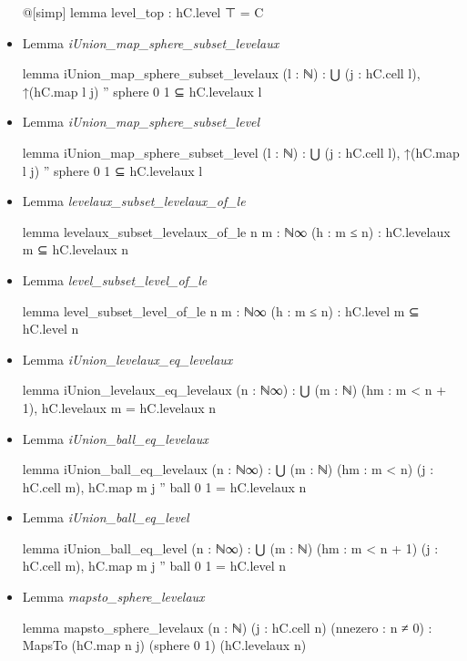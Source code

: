 \documentclass[colorinlistoftodos]{article}
\begin{document}
\begin{itemize}
\begin{leancode}
@[simp] lemma level_top : hC.level ⊤ = C
\end{leancode}
  \item Lemma \emph{iUnion\_map\_sphere\_subset\_levelaux}
\begin{leancode}
lemma iUnion_map_sphere_subset_levelaux (l : ℕ) : 
  ⋃ (j : hC.cell l), ↑(hC.map l j) '' sphere 0 1 ⊆ hC.levelaux l
\end{leancode}
  \item Lemma \emph{iUnion\_map\_sphere\_subset\_level}
\begin{leancode}
lemma iUnion_map_sphere_subset_level (l : ℕ) :
  ⋃ (j : hC.cell l), ↑(hC.map l j) '' sphere 0 1 ⊆ hC.levelaux l
\end{leancode}
  \item Lemma \emph{levelaux\_subset\_levelaux\_of\_le}
\begin{leancode}
lemma levelaux_subset_levelaux_of_le {n m : ℕ∞} (h : m ≤ n) :
  hC.levelaux m ⊆ hC.levelaux n
\end{leancode}
  \item Lemma \emph{level\_subset\_level\_of\_le}
\begin{leancode}
lemma level_subset_level_of_le {n m : ℕ∞} (h : m ≤ n) : hC.level m ⊆ hC.level n
\end{leancode}
  \item Lemma \emph{iUnion\_levelaux\_eq\_levelaux}
\begin{leancode}
lemma iUnion_levelaux_eq_levelaux (n : ℕ∞) : 
  ⋃ (m : ℕ) (hm : m < n + 1), hC.levelaux m = hC.levelaux n
\end{leancode}
  \item Lemma \emph{iUnion\_ball\_eq\_levelaux} 
\begin{leancode}
lemma iUnion_ball_eq_levelaux (n : ℕ∞) :
  ⋃ (m : ℕ) (hm : m < n) (j : hC.cell m), hC.map m j '' ball 0 1 = hC.levelaux n
\end{leancode}
  \item Lemma \emph{iUnion\_ball\_eq\_level}
\begin{leancode}
lemma iUnion_ball_eq_level (n : ℕ∞) :
  ⋃ (m : ℕ) (hm : m < n + 1) (j : hC.cell m), hC.map m j '' ball 0 1 = hC.level n
\end{leancode}
  \item Lemma \emph{mapsto\_sphere\_levelaux}
\begin{leancode}
lemma mapsto_sphere_levelaux (n : ℕ) (j : hC.cell n) (nnezero : n ≠ 0) : 
  MapsTo (hC.map n j) (sphere 0 1) (hC.levelaux  n)
\end{leancode}

\end{itemize}
\end{document}
